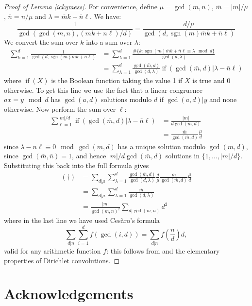 \documentclass[11pt]{amsart}
\newcommand{\OP}{\operatorname}
\numberwithin{equation}{section}
\theoremstyle{definition}
\theoremstyle{remark}
\begin{document}
\begin{proof}[Proof of Lemma \ref{ickymess}]
For convenience, define $\mu=\gcd(m,n)$, $\bar{m}=|m|/\mu$, $\bar{n}=n/\mu$ and $\lambda=\bar{m}k+\bar{n}\ell$. We have:
\[\frac{1}{\gcd\left(\gcd(m,n),(mk+n\ell)/d\right)}=\frac{d/\mu}{\gcd(d,\OP{sgn}(m)\bar{m}k+\bar{n}\ell)}\]
We convert the sum over $k$ into a sum over $\lambda$:
\begin{align*}
\sum_{k=1}^d\frac{1}{\gcd\left(d,\OP{sgn}(m)\bar{m}k+\bar{n}\ell\right)}&=\sum_{\lambda=1}^d\frac{\#\{k:\OP{sgn}(m)\bar{m}k+\bar{n}\ell\equiv\lambda\mod d\}}{\gcd(d,\lambda)}\\
&=\sum_{\lambda=1}^d\frac{\gcd(\bar{m},d)}{\gcd(d,\lambda)}\OP{if}\left(\gcd(\bar{m},d)|\lambda-\bar{n}\ell\right)
\end{align*}
where $\OP{if}(X)$ is the Boolean function taking the value 1 if $X$ is true and 0 otherwise. To get this line we use the fact that a linear congruence $ax=y\mod d$ has $\gcd(a,d)$ solutions modulo $d$ if $\gcd(a,d)|y$ and none otherwise. Now perform the sum over $\ell$:
\begin{align*}
\sum_{\ell=1}^{|m|/d}\OP{if}\left(\gcd(\bar{m},d)|\lambda-\bar{n}\ell\right)&=\frac{|m|}{d\gcd(\bar{m},d)}\\
&=\frac{\bar{m}}{\gcd(\bar{m},d)}\frac{\mu}{d}
\end{align*}
since $\lambda-\bar{n}\ell\equiv 0\mod \gcd(\bar{m},d)$ has a unique solution modulo $\gcd(\bar{m},d)$, since $\gcd(\bar{m},\bar{n})=1$, and hence $|m|/d\gcd(\bar{m},d)$ solutions in $\{1,\ldots,|m|/d\}$. Substituting this back into the full formula gives
\begin{align*}(\dagger)&=\sum_{d|\mu}\sum_{\lambda=1}^d\frac{\gcd(\bar{m},d)}{\gcd(d,\lambda)}\frac{d}{\mu}\frac{\bar{m}}{\gcd(\bar{m},d)}\frac{\mu}{d}\\
&=\sum_{d|\mu}\sum_{\lambda=1}^d\frac{\bar{m}}{\gcd(d,\lambda)}\\
&=\frac{|m|}{\gcd(m,n)^2}\sum_{d|\gcd(m,n)}d^2\end{align*}
where in the last line we have used Ces\`{a}ro's formula
\[\sum_{d|n}\sum_{i=1}^df(\gcd(i,d))=\sum_{d|n}f\!\left(\frac{n}{d}\right)d,\]
valid for any arithmetic function $f$: this follows from {\cite[page 129]{Dick}} and the elementary properties of Dirichlet convolutions.
\end{proof}


\section{Acknowledgements}
\end{document}
